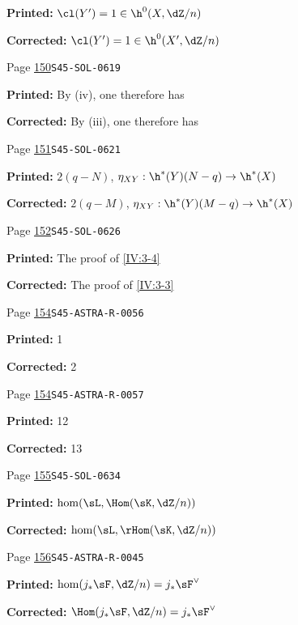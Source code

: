 \begin{description}
\par\noindent\textbf{Printed:} \(\cl(Y')=1\in \h^0(X,\dZ/n)\)
\par\noindent\textbf{Corrected:} \(\cl(Y')=1\in \h^0(X',\dZ/n)\)
\smallskip
\item[\hypertarget{apparatus:EN-0084}{84}] Page \hyperlink{printpage:en:150}{150}\quad\texttt{S45-SOL-0619}
\par\noindent\textbf{Printed:} By (iv), one therefore has
\par\noindent\textbf{Corrected:} By (iii), one therefore has
\smallskip
\item[\hypertarget{apparatus:EN-0085}{85}] Page \hyperlink{printpage:en:151}{151}\quad\texttt{S45-SOL-0621}
\par\noindent\textbf{Printed:} $2(q-N)$, $\eta_{XY}:\h^*(Y)(N-q)\to \h^*(X)$
\par\noindent\textbf{Corrected:} $2(q-M)$, $\eta_{XY}:\h^*(Y)(M-q)\to \h^*(X)$
\smallskip
\item[\hypertarget{apparatus:EN-0086}{86}] Page \hyperlink{printpage:en:152}{152}\quad\texttt{S45-SOL-0626}
\par\noindent\textbf{Printed:} The proof of \ref{IV:3-4}
\par\noindent\textbf{Corrected:} The proof of \ref{IV:3-3}
\smallskip
\item[\hypertarget{apparatus:EN-0087}{87}] Page \hyperlink{printpage:en:154}{154}\quad\texttt{S45-ASTRA-R-0056}
\par\noindent\textbf{Printed:} 1
\par\noindent\textbf{Corrected:} 2
\smallskip
\item[\hypertarget{apparatus:EN-0088}{88}] Page \hyperlink{printpage:en:154}{154}\quad\texttt{S45-ASTRA-R-0057}
\par\noindent\textbf{Printed:} 12
\par\noindent\textbf{Corrected:} 13
\smallskip
\item[\hypertarget{apparatus:EN-0089}{89}] Page \hyperlink{printpage:en:155}{155}\quad\texttt{S45-SOL-0634}
\par\noindent\textbf{Printed:} \(\hom(\sL,\Hom(\sK,\dZ/n))\)
\par\noindent\textbf{Corrected:} \(\hom(\sL,\rHom(\sK,\dZ/n))\)
\smallskip
\item[\hypertarget{apparatus:EN-0090}{90}] Page \hyperlink{printpage:en:156}{156}\quad\texttt{S45-ASTRA-R-0045}
\par\noindent\textbf{Printed:} \(\hom(j_\ast\sF,\dZ/n)=j_\ast\sF^\vee\)
\par\noindent\textbf{Corrected:} \(\Hom(j_\ast\sF,\dZ/n)=j_\ast\sF^\vee\)

\end{description}
